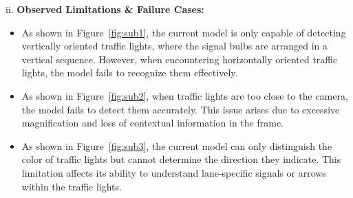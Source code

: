 \documentclass[journal,transmag]{IEEEtran}
\begin{document}
\vspace{1mm}
ii. \textbf{Observed Limitations \& Failure Cases:}
\begin{itemize}
    \item As shown in Figure~\ref{fig:sub1}, the current model is only capable of detecting vertically oriented traffic lights, where the signal bulbs are arranged in a vertical sequence. However, when encountering horizontally oriented traffic lights, the model fails to recognize them effectively. 
    \item As shown in Figure~\ref{fig:sub2}, when traffic lights are too close to the camera, the model fails to detect them accurately. This issue arises due to excessive magnification and loss of contextual information in the frame.
    \item As shown in Figure~\ref{fig:sub3}, the current model can only distinguish the color of traffic lights but cannot determine the direction they indicate. This limitation affects its ability to understand lane-specific signals or arrows within the traffic lights.
\end{itemize}
\end{document}
